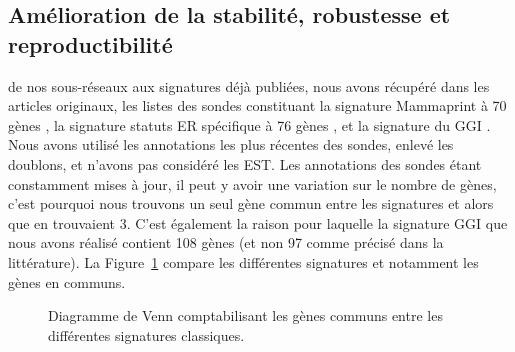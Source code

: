 		\subsection{\textcolor{blue!45!black}{Amélioration de la stabilité, robustesse et reproductibilité}}
			 de nos sous-réseaux aux signatures déjà publiées, nous avons récupéré dans les articles originaux, les listes des sondes constituant la signature Mammaprint à 70 gènes \citep{vandevijver2002}, la signature statuts ER spécifique à 76 gènes \citep{Wang2005}, et la signature du \acs{GGI} \citep{Sotiriou2006}. Nous avons utilisé les annotations les plus récentes des sondes, enlevé les doublons, et n'avons pas considéré les EST. Les annotations des sondes étant constamment mises à jour, il peut y avoir une variation sur le nombre de gènes, c'est pourquoi nous trouvons un seul gène commun entre les signatures \citet{vandevijver2002} et \citet{Wang2005} alors que \citet{Chuang2007} en trouvaient 3. C'est également la raison pour laquelle la signature GGI \citep{Sotiriou2006} que nous avons réalisé contient 108 gènes (et non 97 comme précisé dans la littérature).
			La Figure~\ref{fig:Venn} compare les différentes signatures et notamment les gènes en communs.
			\begin{figure}
				\begin{center}
				\end{center}
				\caption{Diagramme de Venn comptabilisant les gènes communs entre les différentes signatures classiques.}\label{fig:Venn}
			\end{figure}

